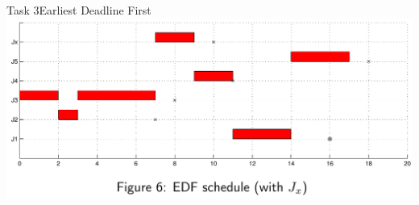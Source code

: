 \begin{frame}{Task 3}{Earliest Deadline First}
  \includegraphics[width=\textwidth]{./figures/3_sol_2.png}
\end{frame}
